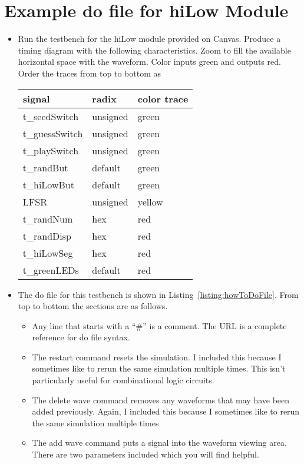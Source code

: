 \section{Example do file for hiLow Module}

\begin{itemize}
\item
  Run the testbench for the hiLow module provided on Canvas. Produce a
  timing diagram with the following characteristics. Zoom to fill the
  available horizontal space with the waveform. Color inputs green and
  outputs red. Order the traces from top to bottom as

\begin{tabular}{p{4cm}p{4cm}p{4cm}}
signal & radix & color trace \\ \hline
    t\_seedSwitch 	&	unsigned 	& green \\
    t\_guessSwitch 	&	unsigned 	& green \\
    t\_playSwitch 	& 	unsigned 	& green \\
    t\_randBut 	& 	default 	& green \\
    t\_hiLowBut 	&	default 	& green \\
    LFSR 		& 	unsigned 	& yellow\\
    t\_randNum 	&	hex 		& red \\
    t\_randDisp 	& 	hex 		& red \\
    t\_hiLowSeg 	&	hex 		& red \\
    t\_greenLEDs 	&	default 	& red \\
    \end{tabular}
    

\item
  The do file for this testbench is shown in Listing~\ref{listing:howToDoFile}. From top to
  bottom the sections are as follows.

  \begin{itemize}
  \item
    Any line that starts with a ``\#'' is a comment. The URL is a
    complete reference for do file syntax.
  \item
    The restart command resets the simulation. I included this because I
    sometimes like to rerun the same simulation multiple times. This
    isn't particularly useful for combinational logic circuits.
  \item
    The delete wave command removes any waveforms that may have been
    added previously. Again, I included this because I sometimes like to
    rerun the same simulation multiple times
  \item
    The add wave command puts a signal into the waveform viewing area.
    There are two parameters included which you will find helpful.


\end{itemize}
\end{itemize}
